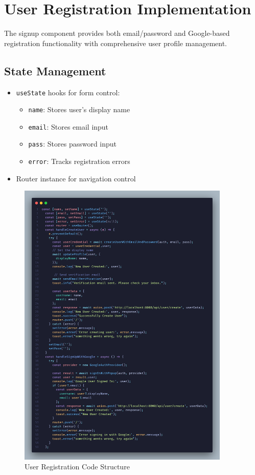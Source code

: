 \section{User Registration Implementation}

The signup component provides both email/password and Google-based registration functionality with comprehensive user profile management.

\subsection{State Management}
\begin{itemize}
    \item \texttt{useState} hooks for form control:
    \begin{itemize}
        \item \texttt{name}: Stores user's display name
        \item \texttt{email}: Stores email input
        \item \texttt{pass}: Stores password input
        \item \texttt{error}: Tracks registration errors
    \end{itemize}
    \item Router instance for navigation control
\end{itemize}

\begin{figure}[H]
    \centering
    \includegraphics[width=0.9\textwidth]{./figures/implementation/signup.png}
    \caption{User Registration Code Structure}
    \label{fig:signup_component}
\end{figure}

